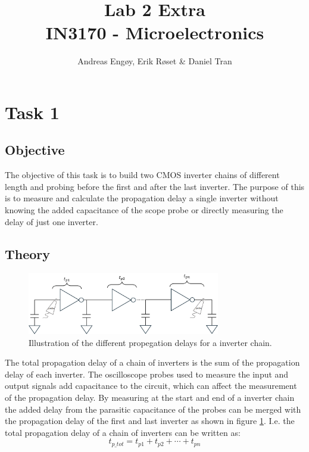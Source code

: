 \documentclass[onecolumn]{article}
\title{Lab 2 Extra \\ \Large{IN3170 - Microelectronics}}
\author{Andreas Engøy, Erik Røset \& Daniel Tran}
\date{\monthname[\the\month] \the\year}
\begin{document}
\maketitle
\vspace*{50mm}
\tableofcontents

\section{Task 1}

\subsection{Objective}
The objective of this task is to build two CMOS inverter chains of different length and probing before the first and after the last inverter. The purpose of this is to measure and calculate the propagation delay a single inverter without knowing the added capacitance of the scope probe or directly measuring the delay of just one inverter.

\subsection{Theory}

\begin{figure}[h!]
    \centering
    \includegraphics[width=0.75\textwidth]{illustration.png}
    \caption{Illustration of the different propegation delays for a inverter chain.}
    \label{fig:illustration}
\end{figure}

The total propagation delay of a chain of inverters is the sum of the propagation delay of each inverter. The oscilloscope probes used to measure the input and output signals add capacitance to the circuit, which can affect the measurement of the propagation delay. By measuring at the start and end of a inverter chain the added delay from the parasitic capacitance of the probes can be merged with the propagation delay of the first and last inverter as shown in figure \ref{fig:illustration}. I.e. the total propagation delay of a chain of inverters can be written as: 
\begin{equation}
    t_{p\_tot} = t_{p1} + t_{p2} + \cdots + t_{pn} 
\end{equation}
\end{document}
